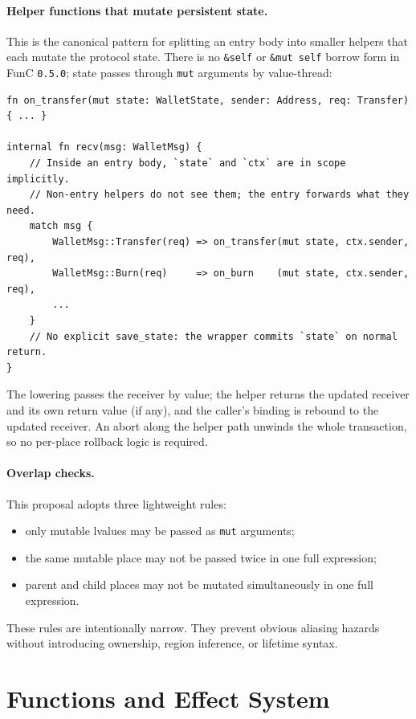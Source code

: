 \documentclass[12pt,oneside]{article}
\begin{document}
\paragraph{Helper functions that mutate persistent state.}
This is the canonical pattern for splitting an entry body into smaller
helpers that each mutate the protocol state. There is no \verb|&self|
or \verb|&mut self| borrow form in FunC \verb|0.5.0|; state passes
through \verb|mut| arguments by value-thread:

\begin{verbatim}
fn on_transfer(mut state: WalletState, sender: Address, req: Transfer) { ... }

internal fn recv(msg: WalletMsg) {
    // Inside an entry body, `state` and `ctx` are in scope implicitly.
    // Non-entry helpers do not see them; the entry forwards what they need.
    match msg {
        WalletMsg::Transfer(req) => on_transfer(mut state, ctx.sender, req),
        WalletMsg::Burn(req)     => on_burn    (mut state, ctx.sender, req),
        ...
    }
    // No explicit save_state: the wrapper commits `state` on normal return.
}
\end{verbatim}

The lowering passes the receiver by value; the helper returns the
updated receiver and its own return value (if any), and the caller's
binding is rebound to the updated receiver. An abort along the helper
path unwinds the whole transaction, so no per-place rollback logic is
required.

\paragraph{Overlap checks.}
This proposal adopts three lightweight rules:

\begin{itemize}
\item only mutable lvalues may be passed as \verb|mut| arguments;
\item the same mutable place may not be passed twice in one full expression;
\item parent and child places may not be mutated simultaneously in one full
expression.
\end{itemize}

These rules are intentionally narrow. They prevent obvious aliasing hazards
without introducing ownership, region inference, or lifetime syntax.

\section{Functions and Effect System}
\end{document}
